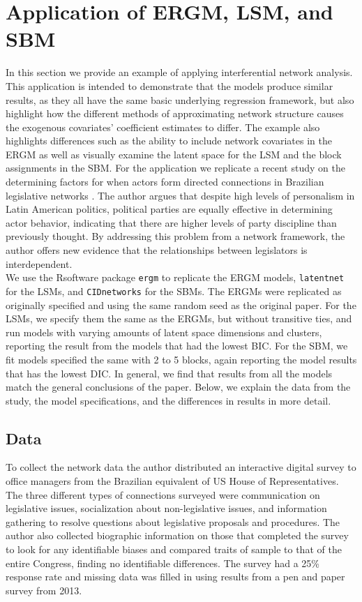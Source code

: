 \documentclass[fleqn,12pt]{wlscirep}
\newcommand{\R}{\textsf{R}\space} %
\begin{document}
\section{Application of ERGM, LSM, and SBM}
In this section we provide an example of applying interferential network analysis. This application is intended to demonstrate that the models produce similar results, as they all have the same basic underlying regression framework, but also highlight how the different methods of approximating network structure causes the exogenous covariates' coefficient estimates to differ. The example also highlights differences such as the ability to include network covariates in the ERGM as well as visually examine the latent space for the LSM and the block assignments in the SBM. For the application we replicate a recent study on the determining factors for when actors form directed connections in Brazilian legislative networks \citep{wojcik2017legislative}. The author argues that despite high levels of personalism in Latin American politics, political parties are equally effective in determining actor behavior, indicating that there are higher levels of party discipline than previously thought. By addressing this problem from a network framework, the author offers new evidence that the relationships between legislators is interdependent.\\

We use the \R software package \texttt{ergm} to replicate the ERGM models, \texttt{latentnet} for the LSMs, and \texttt{CIDnetworks} for the SBMs. The ERGMs were replicated as originally specified and using the same random seed as the original paper. For the LSMs, we specify them the same as the ERGMs, but without transitive ties, and run models with varying amounts of latent space dimensions and clusters, reporting the result from the models that had the lowest BIC. For the SBM, we fit models specified the same with 2 to 5 blocks, again reporting the model results that has the lowest DIC. In general, we find that results from all the models match the general conclusions of the paper. Below, we explain the data from the study, the model specifications, and the differences in results in more detail. 

\subsection{Data}

To collect the network data the author distributed an interactive digital survey to office managers from the Brazilian equivalent of US House of Representatives. The three different types of connections surveyed were communication on legislative issues, socialization about non-legislative issues, and information gathering to resolve questions about legislative proposals and procedures. The author also collected biographic information on those that completed the survey to look for any identifiable biases and compared traits of sample to that of the entire Congress, finding no identifiable differences. The survey had a 25\% response rate and missing data was filled in using results from a pen and paper survey from 2013.
\end{document}
